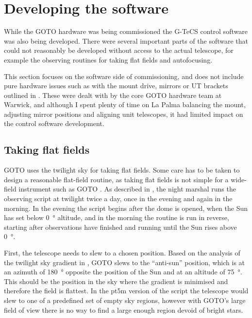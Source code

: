 \section{Developing the software}
\label{sec:software_commissioning}
\begin{colsection}


\begin{colsection}

While the GOTO hardware was being commissioned the G-TeCS control software was also being developed. There were several important parts of the software that could not reasonably be developed without access to the actual telescope, for example the observing routines for taking flat fields and autofocusing.

This section focuses on the software side of commissioning, and does not include pure hardware issues such as with the mount drive, mirrors or UT brackets outlined in . These were dealt with by the core GOTO hardware team at Warwick, and although I spent plenty of time on La Palma balancing the mount, adjusting mirror positions and aligning unit telescopes, it had limited impact on the control software development.

\end{colsection}


\subsection{Taking flat fields}
\label{sec:flats}
\begin{colsection}

GOTO uses the twilight sky for taking flat fields. Some care has to be taken to design a reasonable flat-field routine, as taking flat fields is not simple for a wide-field instrument such as GOTO \citep{flats3, flats2}. As described in , the night marshal runs the  observing script at twilight twice a day, once in the evening and again in the morning. In the evening the script begins after the dome is opened, when the Sun has set below \SI{0}{\degree} altitude, and in the morning the routine is run in reverse, starting after observations have finished and running until the Sun rises above \SI{0}{\degree}.

First, the telescope needs to slew to a chosen position. Based on the analysis of the twilight sky gradient in \citet{flats}, GOTO slews to the ``anti-sun'' position, which is at an azimuth of \SI{180}{\degree} opposite the position of the Sun and at an altitude of \SI{75}{\degree}. This should be the position in the sky where the gradient is minimised and therefore the field is flattest. In the pt5m version of the script the telescope would slew to one of a predefined set of empty sky regions, however with GOTO's large field of view there is no way to find a large enough region devoid of bright stars.


\end{colsection}
\end{colsection}
